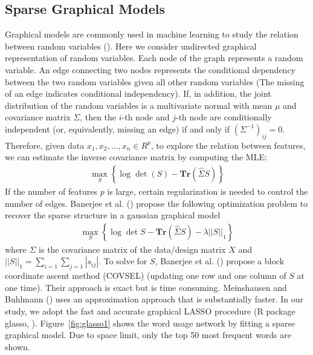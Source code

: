 \documentclass[11pt]{article}
\newcommand{\note}[1]{{\em \color{red} #1}}
\newcommand{\1}[1]{{\mathbf 1}\left\{#1\right\}}        %
\def\lp{\left(}
\def\rp{\right)}
\begin{document}
\subsection{Sparse Graphical Models}
Graphical models are commonly used in machine learning to study the relation between random variables (\cite{wainwright2008graphical}). Here we consider undirected graphical representation of random variables. Each node of the graph represents a random variable. An edge connecting two nodes represents the conditional dependency between the two random variables given all other random variables (The missing of an edge indicates conditional independency). If, in addition, the joint distribution of the random variables is a multivariate normal with mean $\mu$ and covariance matrix $\Sigma$, then the $i$-th node and $j$-th node are conditionally independent (or, equivalently, missing an edge) if and only if $(\Sigma^{-1})_{ij} = 0$. Therefore, given data $x_1,x_2,...,x_n\in R^p$, to explore the relation between features, we can estimate the inverse covariance matrix by computing the MLE:   
\begin{align}
\label{eq:mle}
\max_S \left\{  \log \det \lp S\rp - \textbf{Tr}( \hat{\Sigma}S)  \right\}
\end{align}
If the number of features $p$ is large, certain regularization is needed to control the number of edges. Banerjee et al. (\cite{banerjee2008model}) propose the following optimization problem to recover the sparse structure in a gaussian graphical model
\begin{align}
\label{eq:gLasso}
\max_S \left\{ \log \det S - \textbf{Tr} \lp \hat{\Sigma}S \rp - \lambda ||S||_1 \right\}
\end{align}
where $\Sigma$ is the covariance matrix of the data/design matrix $X$ and $||S||_1 = \sum_{i=1}\sum_{j=1} |s_{ij}|$. To solve for $S$,  Banerjee et al. (\cite{banerjee2008model}) propose a block coordinate ascent method (COVSEL) (updating one row and one column of $S$ at one time). Their approach is exact but is time consuming. Meinshausen and Buhlmann (\cite{meinshausen2006high}) uses an approximation approach that is substantially faster. In our study, we adopt the fast and accurate graphical LASSO procedure ({\sffamily R} package {\sffamily glasso}, \cite{Rglasso}). Figure~\ref{fig:glasso1} shows the word usage network by fitting a sparse graphical model. Due to space limit, only the top 50 most frequent words are shown.

\end{document}
